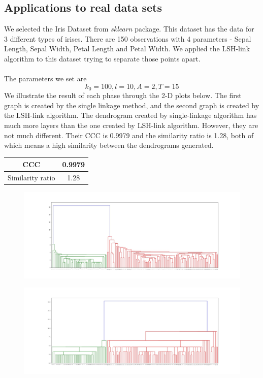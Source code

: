 \documentclass{report}
\begin{document}
\subsection*{Applications to real data sets} 
We selected the Iris Dataset from \textit{sklearn} package. This dataset has the data for 3 different types of irises. There are 150 observations with 4 parameters - Sepal Length, Sepal Width, Petal Length and Petal Width. We applied the LSH-link algorithm to this dataset trying to separate those points apart.\\\\
The parameters we set are $$k_0 = 100, l = 10, A = 2, T = 15$$
We illustrate the result of each phase through the 2-D plots below. The first graph is created by the single linkage method, and the second graph is created by the LSH-link algorithm. The dendrogram created by single-linkage algorithm has much more layers than the one created by LSH-link algorithm. However, they are not much different. Their CCC is 0.9979 and the similarity ratio is 1.28, both of which means a high similarity between the dendrograms generated.
\begin{table}[H]
\centering
\begin{tabular}{cc}
\hline
CCC & 0.9979 \\ \hline
Similarity ratio & 1.28 \\ \hline
\end{tabular}
\end{table}

\begin{figure}[H]
	\centering
	\includegraphics[width=1.0\textwidth]{figures/real_single.jpg}
\end{figure}

\begin{figure}[H]
	\centering
	\includegraphics[width=1.0\textwidth]{figures/real_lsh.jpg}
\end{figure}
\end{document}
